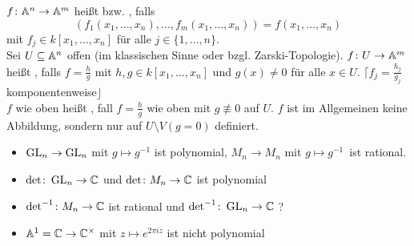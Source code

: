 \begin{defn}
	$f \colon \mathbb{A}^n \rightarrow \mathbb{A}^m$ heißt  bzw. , falls
	\[ (f_1(x_1,\dots,x_n),\dots,f_m(x_1,\dots,x_n)) = f(x_1,\dots,x_n) \]
	mit $f_j \in k[x_1,\dots,x_n]$ für alle $j \in \{1,\dots,n\}$.   \\	
	Sei $U \subseteq \mathbb{A}^n$ offen (im klassischen Sinne oder bzgl. Zarski-Topologie). $f\colon U \rightarrow \mathbb{A}^m$ heißt , falls $f = \frac{h}{g}$ mit $h,g \in k[x_1,\dots,x_n]$ und $g(x) \neq 0$ für alle $x \in U$. \hfill $\lceil f_j = \frac{h_j}{g_j}$ komponentenweise$\rfloor$ \\
	$f$ wie oben heißt , fall $f = \frac{h}{g}$ wie oben mit $g \not\equiv 0$ auf $U$. $f$ ist im Allgemeinen keine Abbildung, sondern nur auf $U \setminus V(g = 0)$ definiert. 
\end{defn}

\begin{bsp}
	\begin{itemize}
		\item $\operatorname{GL}_n \rightarrow \operatorname{GL}_n$ mit $g \mapsto g^{-1}$ ist polynomial, $M_n \rightarrow M_n$ mit \glqq$g \mapsto g^{-1}$\grqq \ ist rational.
		\item $\det\colon \operatorname{GL}_n \rightarrow \mathbb{C}$ und $\det\colon M_n \rightarrow \mathbb{C}$ ist polynomial
		\item $\det^{-1}\colon M_n \rightarrow \mathbb{C}$ ist rational und  $\det^{-1}\colon \operatorname{GL}_n \rightarrow \mathbb{C}$ ?
		\item $\mathbb{A}^1 = \mathbb{C} \rightarrow \mathbb{C}^\times$ mit $z \mapsto e^{2\pi i z}$ ist nicht polynomial
	\end{itemize}
\end{bsp}
\newpage